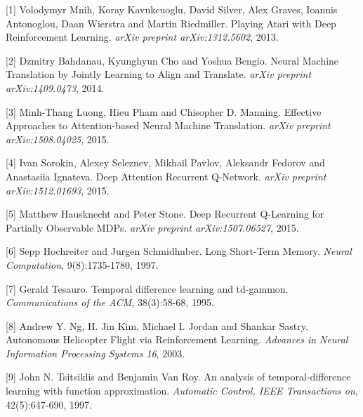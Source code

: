 \documentclass{article}
\begin{document}
[1] Volodymyr Mnih, Koray Kavukcuoglu, David Silver, Alex Graves, Ioannis Antonoglou, Daan Wierstra and Martin Riedmiller. Playing Atari with Deep Reinforcement Learning. {\it arXiv preprint arXiv:1312.5602}, 2013.

[2] Dzmitry Bahdanau, Kyunghyun Cho and Yoshua Bengio. Neural Machine Translation by Jointly Learning to Align and Translate. {\it arXiv preprint arXiv:1409.0473}, 2014.

[3] Minh-Thang Luong, Hieu Pham and Chisopher D. Manning. Effective Approaches to Attention-based Neural Machine Translation. {\it arXiv preprint arXiv:1508.04025}, 2015.

[4] Ivan Sorokin, Alexey Seleznev, Mikhail Pavlov, Aleksandr Fedorov and Anastasiia Ignateva. Deep Attention Recurrent Q-Network. {\it arXiv preprint arXiv:1512.01693}, 2015.

[5] Matthew Hausknecht and Peter Stone. Deep Recurrent Q-Learning for Partially Observable MDPs. {\it arXiv preprint arXiv:1507.06527}, 2015.

[6] Sepp Hochreiter and Jurgen Schmidhuber. Long Short-Term Memory. {\it Neural Computation}, 9(8):1735-1780, 1997.

[7] Gerald Tesauro. Temporal difference learning and td-gammon. {\it Communications of the ACM}, 38(3):58-68, 1995.

[8] Andrew Y. Ng, H. Jin Kim, Michael I. Jordan and Shankar Sastry. Autonomous Helicopter Flight via Reinforcement Learning. {\it Advances in Neural Information Processing Systems 16}, 2003.

[9] John N. Tsitsiklis and Benjamin Van Roy. An analysis of temporal-difference learning with function approximation. {\it Automatic Control, IEEE Transactions on}, 42(5):647-690, 1997.
\end{document}

